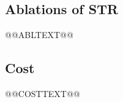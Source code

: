 \subsection{Ablations of STR}
\label{sec:res-abl}
@@ABLTEXT@@

\subsection{Cost}
\label{sec:pilot-cost}
@@COSTTEXT@@
